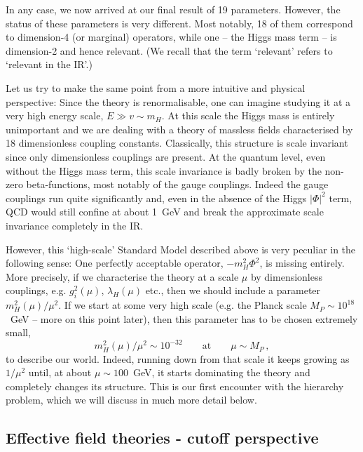 \documentclass[12pt]{article}
\newcommand{\be}{\begin{equation}}
\newcommand{\ee}{\end{equation}}
\numberwithin{equation}{section}
\begin{document}
In any case, we now arrived at our final result of 19 parameters. However, the status of these parameters is very different. Most notably, 18 of them correspond to dimension-4 (or marginal) operators, while one -- the Higgs mass term -- is dimension-2 and hence relevant. (We recall that the term `relevant' refers to `relevant in the IR'.)  

Let us try to make the same point from a more intuitive and physical perspective: Since the theory is renormalisable, one can imagine studying it at a very high energy scale, $E\gg v\sim m_H$. At this scale the Higgs mass is entirely unimportant and we are dealing with a theory of massless fields characterised by 18 dimensionless coupling constants. Classically, this structure is scale invariant since only dimensionless couplings are present. At the quantum level, even without the Higgs mass term, this scale invariance is badly broken by the non-zero beta-functions, most notably of the gauge couplings. Indeed the gauge couplings run quite significantly and, even in the absence of the Higgs $|\Phi|^2$ term, QCD would still confine at about 1~GeV and break the approximate scale invariance completely in the IR.

However, this `high-scale' Standard Model described above is very peculiar in the following sense: One perfectly acceptable operator, $-m_H^2\Phi^2$, is missing entirely. More precisely, if we characterise the theory at a scale $\mu$ by dimensionless couplings, e.g. $g_i^2(\mu)$, $\lambda_H(\mu)$ etc., then we should include a parameter $m_H^2(\mu)/\mu^2$. If we start at some very high scale (e.g. the Planck scale $M_P\sim 10^{18}$~GeV -- more on this point later), then this parameter has to be chosen extremely small,
\be
m_H^2(\mu)/\mu^2 \sim 10^{-32}\qquad\mbox{at}\qquad \mu\sim M_P\,,
\ee 
to describe our world. Indeed, running down from that scale it keeps growing as $1/\mu^2$ until, at about $\mu\sim 100$~GeV, it starts dominating the theory and completely changes its structure. This is our first encounter with the hierarchy problem, which we will discuss in much more detail below. 






\subsection{Effective field theories - cutoff perspective}\label{eft}  
\end{document}
